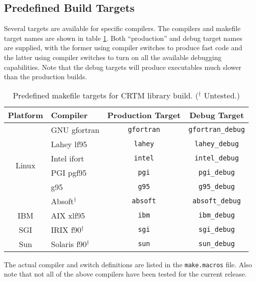\subsection{Predefined Build Targets}
Several targets are available for specific compilers. The compilers and makefile target names are shown in table \ref{tab:predefined_build_targets}. Both ``production'' and debug target names are supplied, with the former using compiler switches to produce fast code and the latter using compiler switches to turn on all the available debugging capabilities. Note that the debug targets will produce executables much slower than the production builds. 
\begin{table}[htp]
  \centering
  \begin{tabular}{clcc}
    \hline
    \sffamily\textbf{Platform} & \sffamily\textbf{Compiler} & \sffamily\textbf{Production Target} & \sffamily\textbf{Debug Target} \\
    \hline\hline
    \multirow{6}{*}{Linux}     & GNU gfortran      & \texttt{gfortran} & \texttt{gfortran\_debug}\\
        &Lahey lf95            & \texttt{lahey}    & \texttt{lahey\_debug}   \\
        &Intel ifort           & \texttt{intel}    & \texttt{intel\_debug}   \\
        &PGI pgf95             & \texttt{pgi}      & \texttt{pgi\_debug}     \\
        &g95                   & \texttt{g95}      & \texttt{g95\_debug}     \\
        &Absoft$^\dagger$      & \texttt{absoft}   & \texttt{absoft\_debug}  \\[0.2cm]
    IBM &AIX xlf95             & \texttt{ibm}      & \texttt{ibm\_debug}     \\[0.2cm]
    SGI &IRIX f90$^\dagger$    & \texttt{sgi}      & \texttt{sgi\_debug}     \\[0.2cm]
    Sun &Solaris f90$^\dagger$ & \texttt{sun}      & \texttt{sun\_debug}     \\
    \hline
  \end{tabular}
  \caption{Predefined makefile targets for CRTM library build. ($^\dagger$ Untested.)}
  \label{tab:predefined_build_targets}
\end{table}

The actual compiler and switch definitions are listed in the \texttt{make.macros} file. Also note that not all of the above compilers have been tested for the current release.

